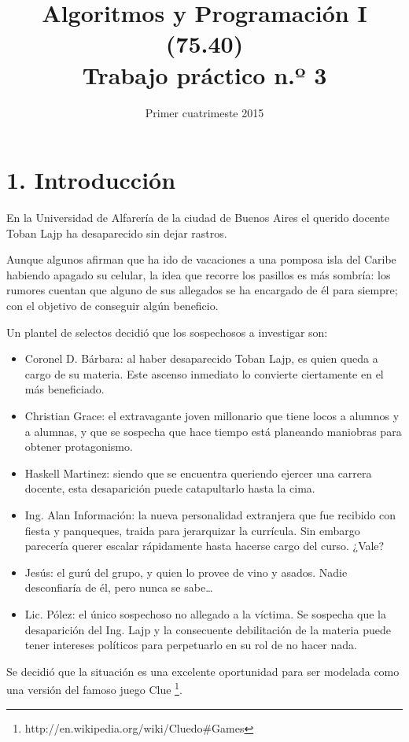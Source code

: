 \documentclass[12pt,spanish,]{article}
\title{Algoritmos y Programación I (75.40)\\Trabajo práctico n.º 3}
\date{Primer cuatrimeste 2015}
\begin{document}
\maketitle

\section{1. Introducción}\label{introducciuxf3n}

En la Universidad de Alfarería de la ciudad de Buenos Aires el querido
docente Toban Lajp ha desaparecido sin dejar rastros.

Aunque algunos afirman que ha ido de vacaciones a una pomposa isla del
Caribe habiendo apagado su celular, la idea que recorre los pasillos es
más sombría: los rumores cuentan que alguno de sus allegados se ha
encargado de él para siempre; con el objetivo de conseguir algún
beneficio.

Un plantel de selectos decidió que los sospechosos a investigar son:

\begin{itemize}
\itemsep1pt\parskip0pt
\item
  Coronel D. Bárbara: al haber desaparecido Toban Lajp, es quien queda a
  cargo de su materia. Este ascenso inmediato lo convierte ciertamente
  en el más beneficiado.
\item
  Christian Grace: el extravagante joven millonario que tiene locos a
  alumnos y a alumnas, y que se sospecha que hace tiempo está planeando
  maniobras para obtener protagonismo.
\item
  Haskell Martinez: siendo que se encuentra queriendo ejercer una
  carrera docente, esta desaparición puede catapultarlo hasta la cima.
\item
  Ing. Alan Información: la nueva personalidad extranjera que fue
  recibido con fiesta y panqueques, traida para jerarquizar la
  currícula. Sin embargo parecería querer escalar rápidamente hasta
  hacerse cargo del curso. ¿Vale?
\item
  Jesús: el gurú del grupo, y quien lo provee de vino y asados. Nadie
  desconfiaría de él, pero nunca se sabe\ldots{}
\item
  Lic. Pólez: el único sospechoso no allegado a la víctima. Se sospecha
  que la desaparición del Ing. Lajp y la consecuente debilitación de la
  materia puede tener intereses políticos para perpetuarlo en su rol de
  no hacer nada.
\end{itemize}

Se decidió que la situación es una excelente oportunidad para ser
modelada como una versión del famoso juego Clue \footnote{http://en.wikipedia.org/wiki/Cluedo\#Games}.
\end{document}
